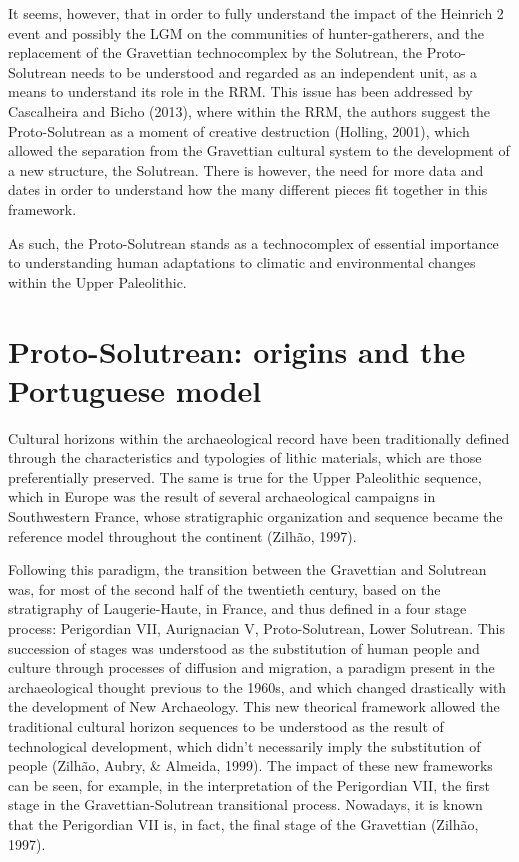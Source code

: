 \documentclass[12pt,twoside]{reedthesis}
\begin{document}
It seems, however, that in order to fully understand the impact of the Heinrich 2 event and possibly the LGM on the communities of hunter-gatherers, and the replacement of the Gravettian technocomplex by the Solutrean, the Proto-Solutrean needs to be understood and regarded as an independent unit, as a means to understand its role in the RRM. This issue has been addressed by Cascalheira and Bicho (2013), where within the RRM, the authors suggest the Proto-Solutrean as a moment of creative destruction (Holling, 2001), which allowed the separation from the Gravettian cultural system to the development of a new structure, the Solutrean. There is however, the need for more data and dates in order to understand how the many different pieces fit together in this framework.

As such, the Proto-Solutrean stands as a technocomplex of essential importance to understanding human adaptations to climatic and environmental changes within the Upper Paleolithic.

\hypertarget{proto-solutrean-origins-and-the-portuguese-model}{%
\section{Proto-Solutrean: origins and the Portuguese model}\label{proto-solutrean-origins-and-the-portuguese-model}}

Cultural horizons within the archaeological record have been traditionally defined through the characteristics and typologies of lithic materials, which are those preferentially preserved. The same is true for the Upper Paleolithic sequence, which in Europe was the result of several archaeological campaigns in Southwestern France, whose stratigraphic organization and sequence became the reference model throughout the continent (Zilhão, 1997).

Following this paradigm, the transition between the Gravettian and Solutrean was, for most of the second half of the twentieth century, based on the stratigraphy of Laugerie-Haute, in France, and thus defined in a four stage process: Perigordian VII, Aurignacian V, Proto-Solutrean, Lower Solutrean. This succession of stages was understood as the substitution of human people and culture through processes of diffusion and migration, a paradigm present in the archaeological thought previous to the 1960s, and which changed drastically with the development of New Archaeology. This new theorical framework allowed the traditional cultural horizon sequences to be understood as the result of technological development, which didn't necessarily imply the substitution of people (Zilhão, Aubry, \& Almeida, 1999). The impact of these new frameworks can be seen, for example, in the interpretation of the Perigordian VII, the first stage in the Gravettian-Solutrean transitional process. Nowadays, it is known that the Perigordian VII is, in fact, the final stage of the Gravettian (Zilhão, 1997).
\end{document}
